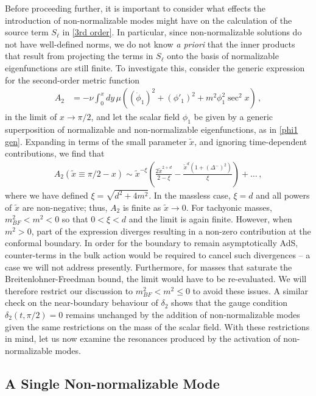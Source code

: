 \documentclass[letterpaper,11pt]{article}
\begin{document}
Before proceeding further, it is important to consider what effects the introduction of non-normalizable modes might have on the calculation of the source term $S_\ell$ in \eqref{3rd order}. In particular, since non-normalizable solutions do not have well-defined norms, we do not know \emph{a priori} that the inner products that result from projecting the terms in $S_\ell$ onto the basis of normalizable eigenfunctions are still finite. To investigate this, consider the generic expression for the second-order metric function
\begin{align}
A_2 &= - \nu \int^x_0 dy \, \mu \left( (\dot \phi_1)^2 + (\phi'_1)^2 + m^2 \phi_1^2 \sec^2 x \right) \, ,
\end{align}
in the limit of $x \to \pi/2$, and let the scalar field $\phi_1$ be given by a generic superposition of normalizable and non-normalizable eigenfunctions, as in \eqref{phi1 gen}. Expanding in terms of the small parameter $\tilde x$, and ignoring time-dependent contributions, we find that
\begin{align}
A_2 (\tilde x \equiv \pi /2 - x) \sim \tilde{x}^{-\xi} \left( \frac{2 \tilde{x}^{2+d}}{2 - \xi} - \frac{\tilde{x}^d (1 + \left(\Delta^{-}\right)^2)}{\xi} \right) + \ldots \, ,
\end{align}
where we have defined $\xi = \sqrt{d^2 + 4m^2}$. In the massless case, $\xi = d$ and all powers of $\tilde{x}$ are non-negative; thus, $A_2$ is finite as $\tilde x \to 0$. For tachyonic masses, $m^2_{BF} < m^2 < 0$ so that $0 < \xi < d$ and the limit is again finite. However, when $m^2 > 0$, part of the expression diverges resulting in a non-zero contribution at the conformal boundary. In order for the boundary to remain asymptotically AdS, counter-terms in the bulk action would be required to cancel such divergences -- a case we will not address presently. Furthermore, for masses that saturate the Breitenlohner-Freedman bound, the limit would have to be re-evaluated. We will therefore restrict our discussion to $m^2_{BF} < m^2 \leq 0$ to avoid these issues. A similar check on the near-boundary behaviour of $\delta_2$ shows that the gauge condition ${\delta_2 (t, \pi/2) = 0}$ remains unchanged by the addition of non-normalizable modes given the same restrictions on the mass of the scalar field. With these restrictions in mind, let us now examine the resonances produced by the activation of non-normalizable modes.


\subsection{A Single Non-normalizable Mode}
\label{ssec: equalNN}
\end{document}
